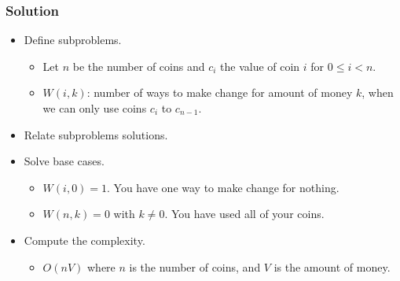 \documentclass{beamer}
\begin{document}
\begin{frame}%
\frametitle{Solution}

\footnotesize

\begin{itemize}

\item Define subproblems.
\begin{itemize}
\footnotesize
\item<1-> Let $n$ be the number of coins and $c_i$ the value of coin $i$ for $0 \le i < n$.
\item<2-> $W(i, k)$: number of ways to make change for amount of money $k$, when
we can only use coins $c_i$ to $c_{n-1}$.
\end{itemize}

\vspace{0.2cm}

\item<3-> Relate subproblems solutions.

\vspace{0.2cm}

\item<4-> Solve base cases.
\begin{itemize}
\footnotesize
\item<4-> $W(i, 0) = 1$. You have one way to make change for nothing.
\item<5-> $W(n, k) = 0$ with $k\ne 0$. You have used all of your coins.
\end{itemize}

\vspace{0.2cm}

\item<6-> Compute the complexity.
\begin{itemize}
\footnotesize
\item<6> $O(nV)$ where $n$ is the number of coins, and $V$ is the amount of money.
\end{itemize}

\end{itemize}

\end{frame}
\end{document}
